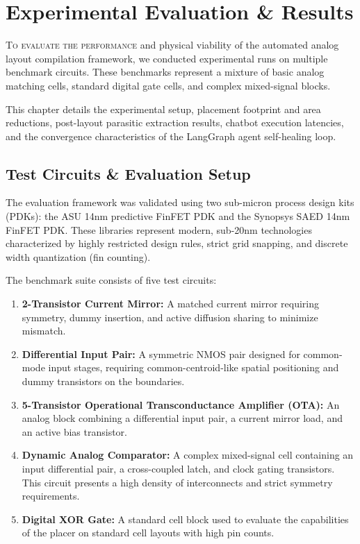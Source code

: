 
\chapter[Experimental Results]{Experimental Evaluation \& Results}
\label{ch:results}

\lettrine[lines=3]{T}{o evaluate the performance} and physical viability of the automated analog layout compilation framework, we conducted experimental runs on multiple benchmark circuits. These benchmarks represent a mixture of basic analog matching cells, standard digital gate cells, and complex mixed-signal blocks. 

This chapter details the experimental setup, placement footprint and area reductions, post-layout parasitic extraction results, chatbot execution latencies, and the convergence characteristics of the LangGraph agent self-healing loop.

\section[Evaluation Setup]{Test Circuits \& Evaluation Setup}
\label{sec:eval_setup}

The evaluation framework was validated using two sub-micron process design kits (PDKs): the ASU 14nm predictive FinFET PDK and the Synopsys SAED 14nm FinFET PDK. These libraries represent modern, sub-20nm technologies characterized by highly restricted design rules, strict grid snapping, and discrete width quantization (fin counting).

The benchmark suite consists of five test circuits:
\begin{enumerate}
    \item \textbf{2-Transistor Current Mirror:} A matched current mirror requiring symmetry, dummy insertion, and active diffusion sharing to minimize mismatch.
    \item \textbf{Differential Input Pair:} A symmetric NMOS pair designed for common-mode input stages, requiring common-centroid-like spatial positioning and dummy transistors on the boundaries.
    \item \textbf{5-Transistor Operational Transconductance Amplifier (OTA):} An analog block combining a differential input pair, a current mirror load, and an active bias transistor.
    \item \textbf{Dynamic Analog Comparator:} A complex mixed-signal cell containing an input differential pair, a cross-coupled latch, and clock gating transistors. This circuit presents a high density of interconnects and strict symmetry requirements.
    \item \textbf{Digital XOR Gate:} A standard cell block used to evaluate the capabilities of the placer on standard cell layouts with high pin counts.
\end{enumerate}

